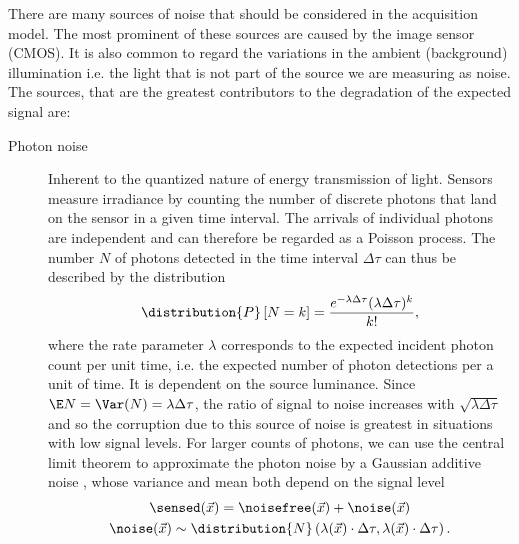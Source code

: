 There are many sources of noise that should be considered in the acquisition model.
The most prominent of these sources are caused by the image sensor (\ac{CMOS}). %
It is also common to regard the variations in the ambient (background) illumination i.e. the light that is not part of 
    the source we are measuring as noise.
The sources, that are the greatest contributors to the degradation of the expected signal are:
\begin{description}
    \item[Photon noise]
        Inherent to the quantized nature of energy transmission of light. 
        Sensors measure irradiance by counting the number of discrete photons that land on the sensor in a given time
            interval. 
        The arrivals of individual photons are independent and can therefore be regarded as a Poisson process.
        The number \(N\) of photons detected in the time interval \(\Delta\tau\) can thus be described by the
            distribution
            \begin{equation*}
                \distribution{P}\left[ N = k \right] = \frac{e^{-\lambda\Delta\tau}(\lambda\Delta\tau)^k}{k!},
            \end{equation*}
            where the rate parameter \(\lambda\) corresponds to the expected incident photon count per unit time, i.e.
            the expected number of photon detections per a unit of time.
        It is dependent on the source luminance.
        Since \(\E N = \Var(N) = \lambda\Delta\tau\), the ratio of signal to noise increases with
            \(\sqrt{\lambda\Delta\tau}\) and so the corruption due to this source of noise is greatest in situations 
            with low signal levels.
        For larger counts of photons, we can use the central limit theorem to approximate the photon noise by a Gaussian
            additive noise , whose variance and mean both depend on the signal level
            \begin{gather*}
                \sensed(\vec{x}) = \noisefree(\vec{x}) + \noise(\vec{x}) \\
                \noise(\vec{x}) \sim \distribution{N}\left(\lambda(\vec{x})\cdot\Delta\tau, 
                                                         \lambda(\vec{x})\cdot\Delta\tau \right).

\end{gather*}
\end{description}
